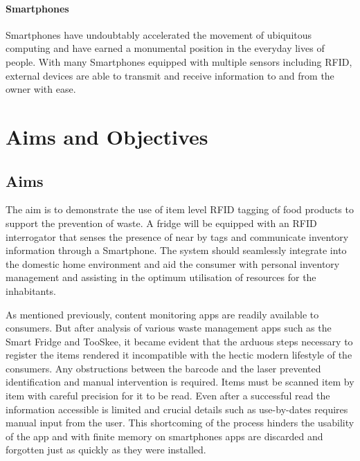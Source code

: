 \documentclass[a4paper, 11pt]{article}
\begin{document}
\paragraph{Smartphones}Smartphones have undoubtably accelerated the movement of ubiquitous computing and have earned a monumental position in the everyday lives of people. With many Smartphones equipped with multiple sensors including RFID, external devices are able to transmit and receive information to and from the owner with ease. 


\clearpage

\section{Aims and Objectives}
\subsection{Aims}


The aim is to demonstrate the use of item level RFID tagging of food products to support the prevention of waste. A fridge will be equipped with an RFID interrogator that senses the presence of near by tags and communicate inventory information through a Smartphone. The system should seamlessly integrate into the domestic home environment and aid the consumer with personal inventory management and assisting in the optimum utilisation of resources for the inhabitants. 

As mentioned previously, content monitoring apps are readily available to consumers. But after analysis of various waste management apps such as the Smart Fridge and TooSkee, it became evident that the arduous steps necessary to register the items rendered it incompatible with the hectic modern lifestyle of the consumers. Any obstructions between the barcode and the laser prevented identification and manual intervention is required. Items must be scanned item by item with careful precision for it to be read. Even after a successful read the information accessible is limited and crucial details such as use-by-dates requires manual input from the user. This shortcoming of the process hinders the usability of the app and with finite memory on smartphones apps are discarded and forgotten just as quickly as they were installed.
\end{document}

